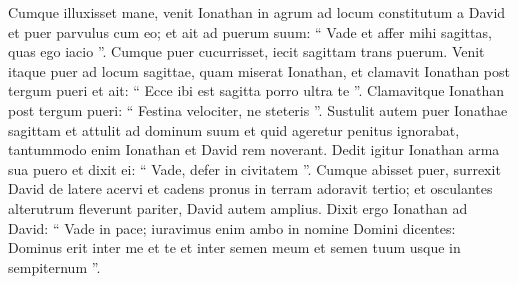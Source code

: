 \begin{biblechapter}
\begin{biblechapter}
\begin{biblechapter}
\begin{biblechapter}
\begin{biblechapter}
\begin{biblechapter}
\begin{biblechapter}
\begin{biblechapter}
\begin{biblechapter}
\begin{biblechapter}
\begin{biblechapter}
\begin{biblechapter}
\begin{biblechapter}
\begin{biblechapter}
\begin{biblechapter}
\begin{biblechapter}
\begin{biblechapter}
\begin{biblechapter}
\begin{biblechapter}
\begin{biblechapter}
 \verse Cumque illuxisset mane, venit Ionathan in agrum ad locum constitutum a David et puer parvulus cum eo; 
\verse et ait ad puerum suum: “ Vade et affer mihi sagittas, quas ego iacio ”. Cumque puer cucurrisset, iecit sagittam trans puerum. 
\verse Venit itaque puer ad locum sagittae, quam miserat Ionathan, et clamavit Ionathan post tergum pueri et ait: “ Ecce ibi est sagitta porro ultra te ”. 
\verse Clamavitque Ionathan post tergum pueri: “ Festina velociter, ne steteris ”. Sustulit autem puer Ionathae sagittam et attulit ad dominum suum 
\verse et quid ageretur penitus ignorabat, tantummodo enim Ionathan et David rem noverant.
 \verse Dedit igitur Ionathan arma sua puero et dixit ei: “ Vade, defer in civitatem ”. 
\verse Cumque abisset puer, surrexit David de latere acervi et cadens pronus in terram adoravit tertio; et osculantes alterutrum fleverunt pariter, David autem amplius. 
\verse Dixit ergo Ionathan ad David: “ Vade in pace; iuravimus enim ambo in nomine Domini dicentes: Dominus erit inter me et te et inter semen meum et semen tuum usque in sempiternum ”.
 

\end{biblechapter}
\end{biblechapter}
\end{biblechapter}
\end{biblechapter}
\end{biblechapter}
\end{biblechapter}
\end{biblechapter}
\end{biblechapter}
\end{biblechapter}
\end{biblechapter}
\end{biblechapter}
\end{biblechapter}
\end{biblechapter}
\end{biblechapter}
\end{biblechapter}
\end{biblechapter}
\end{biblechapter}
\end{biblechapter}
\end{biblechapter}
\end{biblechapter}
